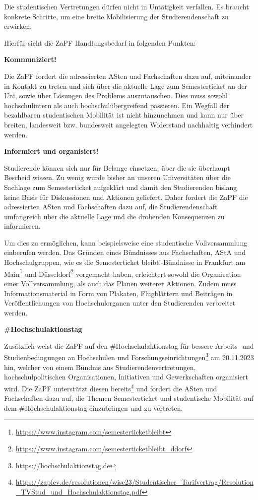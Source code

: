 \documentclass[DIV=calc]{scrartcl}
\let\oldgrqq=\grqq
\def\grqq{\oldgrqq\xspace}
\begin{document}
Die studentischen Vertretungen dürfen nicht in Untätigkeit verfallen. Es braucht konkrete Schritte, um eine breite Mobilisierung der Studierendenschaft zu erwirken.

Hierfür sieht die ZaPF Handlungsbedarf in folgenden Punkten:

\begin{center}
    \textbf{Kommuniziert!}
\end{center}

Die ZaPF fordert die adressierten ASten und Fachschaften dazu auf, miteinander in Kontakt zu treten und sich über die aktuelle Lage zum Semesterticket an der Uni, sowie über Lösungen des Problems auszutauschen. Dies muss sowohl hochschulintern als auch hochschulübergreifend passieren. Ein Wegfall der bezahlbaren studentischen Mobilität ist nicht hinzunehmen und kann nur über breiten, landesweit bzw. bundesweit angelegten Widerstand nachhaltig verhindert werden.

\clearpage
\begin{center}
    \textbf{Informiert und organisiert!}
\end{center}

Studierende können sich nur für Belange einsetzen, über die sie überhaupt Bescheid wissen. Zu wenig wurde bisher an unseren Universitäten über die Sachlage zum Semesterticket aufgeklärt und damit den Studierenden bislang keine Basis für Diskussionen und Aktionen geliefert. Daher fordert die ZaPF die adressierten ASten und Fachschaften dazu auf, die Studierendenschaft umfangreich über die aktuelle Lage und die drohenden Konsequenzen zu informieren.

Um dies zu ermöglichen, kann beispielsweise eine studentische Vollversammlung einberufen werden. Das Gründen eines Bündnisses aus Fachschaften, AStA und Hochschulgruppen, wie es die \glqq Semesterticket bleibt!\grqq{}-Bündnisse in Frankfurt am Main\footnote{\url{https://www.instagram.com/semesterticketbleibt}} und Düsseldorf\footnote{\url{https://www.instagram.com/semesterticketbleibt\_ddorf}} vorgemacht haben, erleichtert sowohl die Organisation einer Vollversammlung, als auch das Planen weiterer Aktionen. Zudem muss Informationsmaterial in Form von Plakaten, Flugblättern und Beiträgen in Veröffentlichungen von Hochschulorganen unter den Studierenden verbreitet werden.

\begin{center}
    \textbf{\#Hochschulaktionstag}
\end{center}

Zusätzlich weist die ZaPF auf den \#Hochschulaktionstag für bessere Arbeits- und Studienbedingungen an Hochschulen und Forschungseinrichtungen\footnote{\url{https://hochschulaktionstag.de}} am 20.11.2023 hin, welcher von einem Bündnis aus Studierendenvertretungen, hochschulpolitischen Organisationen, Initiativen und Gewerkschaften organisiert wird. Die ZaPF unterstützt diesen bereits\footnote{\url{https://zapfev.de/resolutionen/wise23/Studentischer\_Tarifvertrag/Resolution\_TVStud\_und\_Hochschulaktionstag.pdf}} und fordert die ASten und Fachschaften dazu auf, die Themen Semesterticket und studentische Mobilität auf dem \#Hochschulaktionstag einzubringen und zu vertreten.
\end{document}

